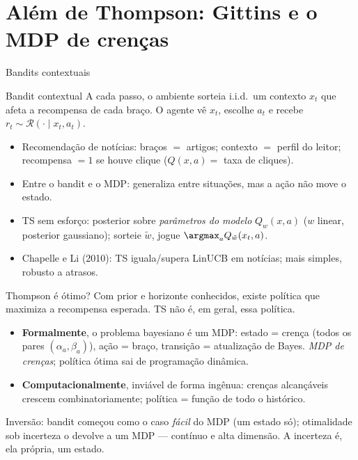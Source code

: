 \documentclass[aspectratio=169, 11pt]{beamer}
\begin{document}
\section{Além de Thompson: Gittins e o MDP de crenças}

\begin{frame}{Bandits contextuais}
  \begin{defbox}{Bandit contextual}
    A cada passo, o ambiente sorteia i.i.d.\ um \alert{contexto} $x_t$ que
    afeta a recompensa de cada braço. O agente vê $x_t$, escolhe $a_t$ e
    recebe $r_t \sim \mathcal{R}(\cdot \mid x_t, a_t)$.
  \end{defbox}

  \begin{itemize}
    \item Recomendação de notícias: braços $=$ artigos; contexto $=$
          perfil do leitor; recompensa $= 1$ se houve clique
          ($Q(x,a) = $ taxa de cliques).
    \item Entre o bandit e o MDP: generaliza entre situações, mas a ação
          não move o estado.
    \item TS sem esforço: posterior sobre \emph{parâmetros do modelo}
          $Q_w(x,a)$ ($w$ linear, posterior gaussiano); sorteie
          $\tilde{w}$, jogue $\argmax_a Q_{\tilde{w}}(x_t,a)$.
    \item Chapelle e Li (2010): TS iguala/supera LinUCB em notícias;
          mais simples, robusto a atrasos.
  \end{itemize}
\end{frame}

\begin{frame}{Thompson é ótimo?}
  Com prior e horizonte conhecidos, existe política que maximiza a
  recompensa esperada. TS não é, em geral, essa política.

  \begin{itemize}
    \item \textbf{Formalmente}, o problema bayesiano é um MDP: estado =
          \alert{crença} (todos os pares $(\alpha_a,\beta_a)$), ação =
          braço, transição = atualização de Bayes. \emph{MDP de crenças};
          política ótima sai de programação dinâmica.
    \item \textbf{Computacionalmente}, inviável de forma ingênua: crenças
          alcançáveis crescem combinatoriamente; política = função de todo
          o histórico.
  \end{itemize}

  \begin{ideiabox}
    Inversão: bandit começou como o caso \emph{fácil} do MDP (um estado
    só); otimalidade sob incerteza o devolve a um MDP — contínuo e
    alta dimensão. \alert{A incerteza é, ela própria, um estado.}
  \end{ideiabox}
\end{frame}
\end{document}
